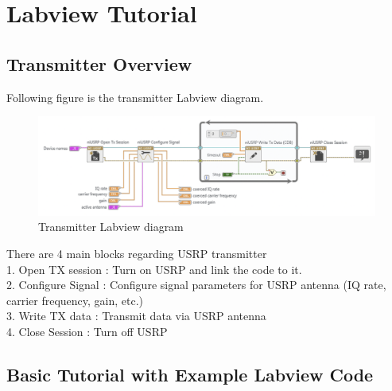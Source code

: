 \section{Labview Tutorial }
\subsection{Transmitter Overview}

    Following figure is the transmitter Labview diagram. \\
    
    \vspace{-4mm}  
    \begin{figure}[!h]\raggedleft
    \hspace{15mm}
		\includegraphics[width=.95\textwidth]{image/week03/2-1-1.png}
		\caption{\footnotesize Transmitter Labview diagram}
		\vspace{-10pt}
    \end{figure}
    
    There are 4 main blocks regarding USRP transmitter \\
    1. Open TX session : Turn on USRP and link the code to it. \\
    2. Configure Signal : Configure signal parameters for USRP antenna (IQ rate, carrier frequency, gain, etc.) \\
    3. Write TX data : Transmit data via USRP antenna \\
    4. Close Session : Turn off USRP \\
\clearpage

    
\subsection{Basic Tutorial with Example Labview Code}
    
